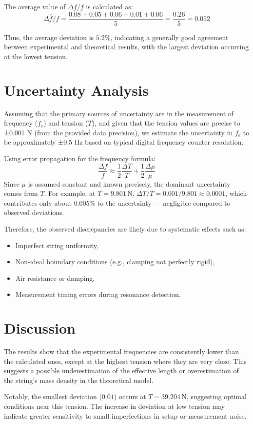 \documentclass[12pt]{article}
\begin{document}
The average value of \(\Delta f / f\) is calculated as:
\[
\bar{\Delta f / f} = \frac{0.08 + 0.05 + 0.06 + 0.01 + 0.06}{5} = \frac{0.26}{5} = 0.052
\]

Thus, the average deviation is \(5.2\%\), indicating a generally good agreement between experimental and theoretical results, with the largest deviation occurring at the lowest tension.

\section*{Uncertainty Analysis}
Assuming that the primary sources of uncertainty are in the measurement of frequency (\(f_e\)) and tension (\(T\)), and given that the tension values are precise to ±0.001 N (from the provided data precision), we estimate the uncertainty in \(f_e\) to be approximately ±0.5 Hz based on typical digital frequency counter resolution.

Using error propagation for the frequency formula:
\[
\frac{\Delta f}{f} \approx \frac{1}{2} \frac{\Delta T}{T} + \frac{1}{2} \frac{\Delta \mu}{\mu}
\]
Since \(\mu\) is assumed constant and known precisely, the dominant uncertainty comes from \(T\). For example, at \(T = 9.801\,\mathrm{N}\), \(\Delta T / T = 0.001 / 9.801 \approx 0.0001\), which contributes only about 0.005\% to the uncertainty — negligible compared to observed deviations.

Therefore, the observed discrepancies are likely due to systematic effects such as:
\begin{itemize}
  \item Imperfect string uniformity,
  \item Non-ideal boundary conditions (e.g., clamping not perfectly rigid),
  \item Air resistance or damping,
  \item Measurement timing errors during resonance detection.
\end{itemize}

\section*{Discussion}
The results show that the experimental frequencies are consistently lower than the calculated ones, except at the highest tension where they are very close. This suggests a possible underestimation of the effective length or overestimation of the string's mass density in the theoretical model.

Notably, the smallest deviation (\(0.01\)) occurs at \(T = 39.204\,\mathrm{N}\), suggesting optimal conditions near this tension. The increase in deviation at low tension may indicate greater sensitivity to small imperfections in setup or measurement noise.
\end{document}
